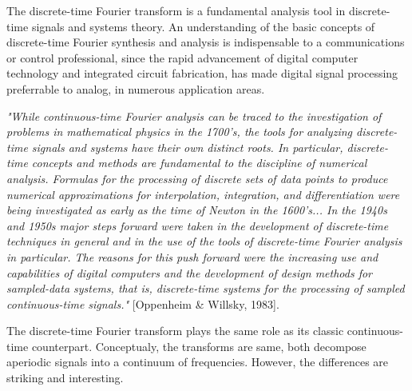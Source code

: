 \documentclass{article}
\begin{document}
\begin{CellGroup}


The discrete-time Fourier transform is a fundamental analysis tool in  discrete-time signals and systems theory. An understanding of the basic  concepts
of discrete-time Fourier synthesis and analysis is indispensable to  a communications or control professional, since the rapid advancement of  digital
computer technology and integrated circuit fabrication, has made  digital signal processing preferrable to analog, in numerous application  areas.

{\itshape "While continuous-time Fourier analysis can be traced to the  investigation of problems in mathematical physics in the 1700's, the tools
 for analyzing discrete-time signals and systems have their own distinct  roots. In particular, discrete-time concepts and methods are fundamental
to  the discipline of numerical analysis. Formulas for the processing of discrete  sets of data points to produce numerical approximations for interpolation,
 integration, and differentiation were being investigated as early as the time  of Newton in the 1600's... In the 1940s and 1950s major steps forward
were  taken in the development of discrete-time techniques in general and in the  use of the tools of discrete-time Fourier analysis in particular.
The reasons  for this push forward were the increasing use and capabilities of digital  computers and the development of design methods for sampled-data
systems,  that is, discrete-time systems for the processing of sampled continuous-time  signals." }[Oppenheim \&{} Willsky, 1983].

The discrete-time Fourier transform plays  the same role as its classic continuous-time counterpart. Conceptualy, the  transforms are same, both
decompose aperiodic signals into a continuum of  frequencies. However, the differences are striking and interesting. 




\end{CellGroup}
\end{document}
